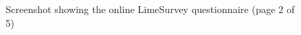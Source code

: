 \begin{figure}
\ContinuedFloat
 \centering
 \caption[Screenshot showing the online questionnaire (page 2 of 5)]{Screenshot showing the online LimeSurvey questionnaire (page 2 of 5)}
 \label{appendix:appendicies:developer-suvery-one-page-002}
\end{figure}


